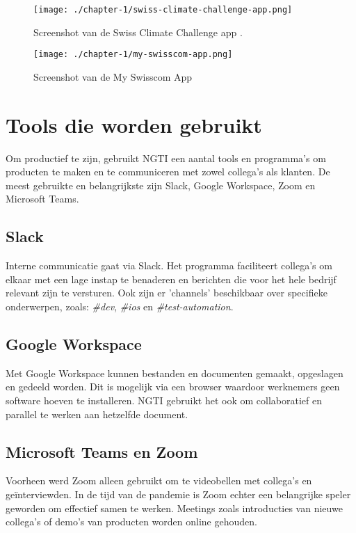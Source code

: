 \begin{figure}[hbt!]
  \centering
  \begin{minipage}{0.45\textwidth}
      \centering
      \texttt{[image: ./chapter-1/swiss-climate-challenge-app.png]}
      \caption{Screenshot van de Swiss Climate Challenge app \cite{ngti-swisscom-climate-challenge}.}
      \label{fig:swiss-climate-challenge-app}
  \end{minipage}\hfill
  \begin{minipage}{0.45\textwidth}
      \centering
      \texttt{[image: ./chapter-1/my-swisscom-app.png]}
      \caption{Screenshot van de My Swisscom App \cite{ngti-my-swisscom-app}}
      \label{fig:my-swisscom-app}
  \end{minipage}
\end{figure}


\section{Tools die worden gebruikt}\label{sec:ch1-tools-die-gebruikt-worden}
Om productief te zijn, gebruikt NGTI een aantal tools en programma's om producten te maken en te communiceren met zowel collega's als klanten. De meest gebruikte en belangrijkste zijn Slack, Google Workspace, Zoom en Microsoft Teams.

\subsection{Slack}\label{subsec:slack}
Interne communicatie gaat via Slack. Het programma faciliteert collega's om elkaar met een lage instap te benaderen en berichten die voor het hele bedrijf relevant zijn te versturen. Ook zijn er 'channels' beschikbaar over specifieke onderwerpen, zoals: \textit{\#dev}, \textit{\#ios} en \textit{\#test-automation}.

\subsection{Google Workspace}\label{subsec:google-workspace}
Met Google Workspace kunnen bestanden en documenten gemaakt, opgeslagen en gedeeld worden. Dit is mogelijk via een browser waardoor werknemers geen software hoeven te installeren. NGTI gebruikt het ook om collaboratief en parallel te werken aan hetzelfde document.

\subsection{Microsoft Teams en Zoom}\label{subsec:microsoft-teams-en-zoom}
Voorheen werd Zoom alleen gebruikt om te videobellen met collega's en geïnterviewden. In de tijd van de pandemie is Zoom echter een belangrijke speler geworden om effectief samen te werken. Meetings zoals introducties van nieuwe collega's of demo's van producten worden online gehouden.

